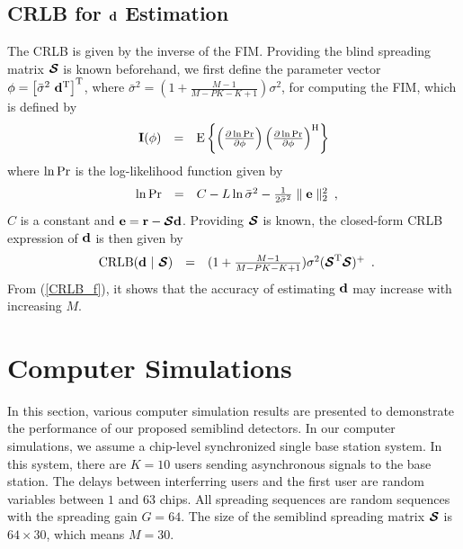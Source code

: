 \documentclass[a4paper,10pt,fleqn, twocolumn]{IEEETran}
\newcommand{\br}{{\mathbf r}}
\newcommand{\bd}{{\bf d}}
\newcommand{\bbf}{{\bf d}}
\newcommand{\bI}{{\bf I}}
\newcommand{\bcS}{{\mbox {\boldmath ${\cal S}$}}}
\begin{document}
\subsection{CRLB for $\bd$ Estimation}
The CRLB is given by the inverse of the FIM. Providing the blind
spreading matrix $\bcS$ is known beforehand, we first define the
parameter vector $\mathbf{\phi} = \left[\bar{\sigma}^{2}\
\bbf^{\rm T}\right]^{\rm T}$, where $\bar{\sigma}^{2}
=(1+\frac{M-1}{M-PK-K+1})\sigma^{2}$, for computing the FIM, which
is defined by
\begin{equation}
\begin{array}{rcl}
\bI(\mathbf{\phi}) &=& {\rm E} \left\{ \left( \frac{\partial
\ln{\rm Pr}}{\partial \mathbf{\phi}} \right) \left( \frac{\partial
\ln{\rm Pr}}{\partial \mathbf{\phi}} \right)^{\rm H} \right\}
\label{fim}
\end{array}
\end{equation}
\noindent where $\ln{\rm Pr}$ is the log-likelihood function given
by
\begin{equation}
\begin{array}{rcl}
\ln{\rm
Pr}&=&C-L\ln\bar{\sigma}^2-\frac{1}{2\bar{\sigma}^2}\parallel\mathbf{e}\parallel_2^2
\end{array},\label{logl}
\end{equation}
\noindent $C$ is a constant and $\mathbf{e}=\br-\bcS\bbf$.
Providing $\bcS$ is known, the closed-form CRLB expression of
$\bbf$ is then given by
\begin{equation}
\begin{array}{rcl}
{\rm CRLB}(\bbf\ |\ \bcS) &
=&(1+\frac{M-1}{M-PK-K+1})\sigma^{2}(\bcS^{\rm T}\bcS)^{\rm +}
\end{array}.\label{CRLB_f}
\end{equation}
\noindent From (\ref{CRLB_f}), it shows that the accuracy of
estimating $\bbf$ may increase with increasing $M$.
\section{Computer Simulations}
In this section, various computer simulation results are presented
to demonstrate the performance of our proposed semiblind
detectors. In our computer simulations, we assume a chip-level
synchronized single base station system. In this system, there are
$K=10$ users sending asynchronous signals to the base station. The
delays between interferring users and the first user are random
variables between $1$ and $63$ chips. All spreading sequences are
random sequences with the spreading gain $G=64$. The size of the
semiblind spreading matrix $\bcS$ is $64\times30$, which means
$M=30$.
\end{document}
